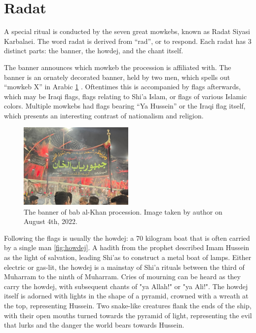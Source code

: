 \section{Radat}
A special ritual is conducted by the seven great mowkebs, known as Radat Siyasi Karbalaei. The word radat is derived from “rad”, or to respond. Each radat has 3 distinct parts: the banner, the howdej, and the chant itself. 

The banner announces which mowkeb the procession is affiliated with. The banner is an ornately decorated banner, held by two men, which spells out “mowkeb X” in Arabic \ref{fig:bab-alkhan} . Oftentimes this is accompanied by flags afterwards, which may be Iraqi flags, flags relating to Shi'a Islam, or flags of various Islamic colors. Multiple mowkebs had flags bearing “Ya Hussein” or the Iraqi flag itself, which presents an interesting contrast of nationalism and religion. 

\begin{figure}
    \centering
    \includegraphics[width=0.5\textwidth]{images/mowkeb-bab-alkhan.jpg}
    \caption{The banner of bab al-Khan procession. Image taken by author on August 4th, 2022.}
    \label{fig:bab-alkhan}
\end{figure}

Following the flags is usually the howdej: a 70 kilogram boat that is often carried by a single man \ref{fig:howdej}. A hadith from the prophet described Imam Hussein as the light of salvation, leading Shi'as to construct a metal boat of lamps. Either electric or gas-lit, the howdej is a mainstay of Shi'a rituals between the third of Muharram to the ninth of Muharram. Cries of mourning can be heard as they carry the howdej, with subsequent chants of "ya Allah!" or "ya Ali!". The howdej itself is adorned with lights in the shape of a pyramid, crowned with a wreath at the top, representing Hussein. Two snake-like creatures flank the ends of the ship, with their open mouths turned towards the pyramid of light, representing the evil that lurks and the danger the world bears towards Hussein. 

